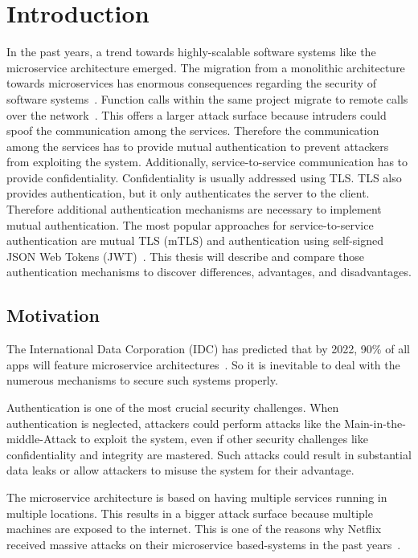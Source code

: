 \chapter{Introduction}
\label{cha:Introduction}
In the past years, a trend towards highly-scalable software systems like the microservice architecture emerged.
The migration from a monolithic architecture towards microservices has enormous consequences regarding the security of software systems~\cite{shmeleva2020microservices}. 
Function calls within the same project migrate to remote calls over the network~\cite{chandramouli2019microservices}. 
This offers a larger attack surface because intruders could spoof the communication among the services.
Therefore the communication among the services has to provide mutual authentication to prevent attackers from exploiting the system.
Additionally, service-to-service communication has to provide confidentiality.
Confidentiality is usually addressed using TLS.
TLS also provides authentication, but it only authenticates the server to the client.
Therefore additional authentication mechanisms are necessary to implement mutual authentication.
The most popular approaches for service-to-service authentication are mutual TLS (mTLS) and authentication using self-signed JSON Web Tokens (JWT)~\cite{dias2020microservices}.
This thesis will describe and compare those authentication mechanisms to discover differences, advantages, and disadvantages.

\section{Motivation}
The International Data Corporation (IDC) has predicted that by 2022, 90\% of all apps will feature microservice architectures~\cite{idcprediction2019}. 
So it is inevitable to deal with the numerous mechanisms to secure such systems properly. 

Authentication is one of the most crucial security challenges.
When authentication is neglected, attackers could perform attacks like the Main-in-the-middle-Attack to exploit the system, even if other security challenges like confidentiality and integrity are mastered.
Such attacks could result in substantial data leaks or allow attackers to misuse the system for their advantage.

The microservice architecture is based on having multiple services running in multiple locations.
This results in a bigger attack surface because multiple machines are exposed to the internet.
This is one of the reasons why Netflix received massive attacks on their microservice based-systems in the past years~\cite{pereira2019security}.

